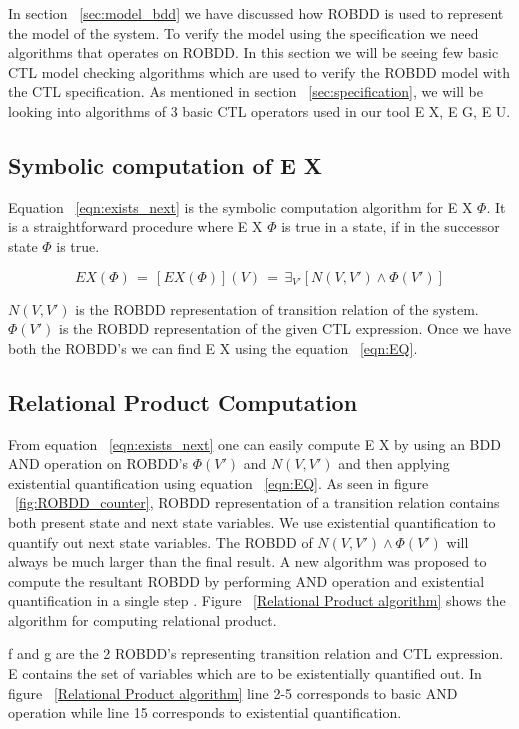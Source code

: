 In section ~\ref{sec:model_bdd} we have discussed how ROBDD is used to represent the model of the system. To verify the model using the specification we need algorithms that operates on ROBDD. In this section we will be seeing few basic CTL model checking algorithms which are used to verify the ROBDD model with the CTL specification. As mentioned in section ~\ref{sec:specification}, we will be looking into algorithms of 3 basic CTL operators used in our tool E X, E G, E U.

\subsection*{Symbolic computation of E X}
Equation ~\ref{eqn:exists_next} is the symbolic computation algorithm for E X $\Phi$. It is a straightforward procedure where E X $\Phi$ is true in a state, if in the successor state $\Phi$ is true.

\begin{equation}
\label{eqn:exists_next}
EX(\Phi)\,=\,[EX(\Phi)](V)\,=\,\exists_{V'} [N(V,V')\wedge \Phi(V')]
\end{equation}

$N(V,V')$ is the ROBDD representation of transition relation of the system. $\Phi(V')$ is the ROBDD representation of the given CTL expression. Once we have both the ROBDD's we can find E X using the equation ~\ref{eqn:EQ}.

\subsection*{Relational Product Computation}

From equation ~\ref{eqn:exists_next} one can easily compute E X by using an BDD AND operation on ROBDD's $\Phi(V')$ and $N(V,V')$ and then applying existential quantification using equation ~\ref{eqn:EQ}. As seen in figure ~\ref{fig:ROBDD_counter}, ROBDD representation of a transition relation contains both present state and next state variables. We use existential quantification to quantify out next state variables. The ROBDD of $N(V,V') \land \Phi(V')$ will always be much larger than the final result. A new algorithm was proposed to compute the resultant ROBDD by performing AND operation and existential quantification in a single step \cite{Clarke 1999}. Figure ~\ref{Relational Product algorithm} shows the algorithm for computing relational product.

f and g are the 2 ROBDD's representing transition relation and CTL expression. E contains the set of variables which are to be existentially quantified out. In figure ~\ref{Relational Product algorithm} line 2-5 corresponds to basic AND operation while line 15 corresponds to existential quantification. 

